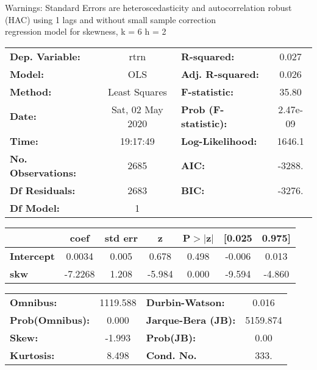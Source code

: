 Warnings: \newline
 [1] Standard Errors are heteroscedasticity and autocorrelation robust (HAC) using 1 lags and without small sample correction\\ 

regression model for skewness, k = 6 h = 2\begin{center}
\begin{tabular}{lclc}
\toprule
\textbf{Dep. Variable:}    &       rtrn       & \textbf{  R-squared:         } &     0.027   \\
\textbf{Model:}            &       OLS        & \textbf{  Adj. R-squared:    } &     0.026   \\
\textbf{Method:}           &  Least Squares   & \textbf{  F-statistic:       } &     35.80   \\
\textbf{Date:}             & Sat, 02 May 2020 & \textbf{  Prob (F-statistic):} &  2.47e-09   \\
\textbf{Time:}             &     19:17:49     & \textbf{  Log-Likelihood:    } &    1646.1   \\
\textbf{No. Observations:} &        2685      & \textbf{  AIC:               } &    -3288.   \\
\textbf{Df Residuals:}     &        2683      & \textbf{  BIC:               } &    -3276.   \\
\textbf{Df Model:}         &           1      & \textbf{                     } &             \\
\bottomrule
\end{tabular}
\begin{tabular}{lcccccc}
                   & \textbf{coef} & \textbf{std err} & \textbf{z} & \textbf{P$> |$z$|$} & \textbf{[0.025} & \textbf{0.975]}  \\
\midrule
\textbf{Intercept} &       0.0034  &        0.005     &     0.678  &         0.498        &       -0.006    &        0.013     \\
\textbf{skw}       &      -7.2268  &        1.208     &    -5.984  &         0.000        &       -9.594    &       -4.860     \\
\bottomrule
\end{tabular}
\begin{tabular}{lclc}
\textbf{Omnibus:}       & 1119.588 & \textbf{  Durbin-Watson:     } &    0.016  \\
\textbf{Prob(Omnibus):} &   0.000  & \textbf{  Jarque-Bera (JB):  } & 5159.874  \\
\textbf{Skew:}          &  -1.993  & \textbf{  Prob(JB):          } &     0.00  \\
\textbf{Kurtosis:}      &   8.498  & \textbf{  Cond. No.          } &     333.  \\
\bottomrule
\end{tabular}
\end{center}

